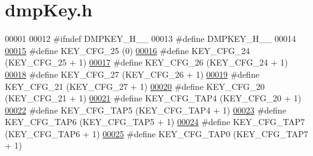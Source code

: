 \hypertarget{dmp_key_8h_source}{}\section{dmp\+Key.\+h}
\label{dmp_key_8h_source}

\begin{DoxyCode}
00001 
00012 \textcolor{preprocessor}{#ifndef DMPKEY\_H\_\_}
00013 \textcolor{preprocessor}{#define DMPKEY\_H\_\_}
00014 
\hypertarget{dmp_key_8h_source.tex_l00015}{}\hyperlink{dmp_key_8h_afb06e105999e6243c0ae2e818034647e}{00015} \textcolor{preprocessor}{#define KEY\_CFG\_25                  (0)}
\hypertarget{dmp_key_8h_source.tex_l00016}{}\hyperlink{dmp_key_8h_aa5e453c6dea0f527e5bd6c30a5ed445d}{00016} \textcolor{preprocessor}{#define KEY\_CFG\_24                  (KEY\_CFG\_25 + 1)}
\hypertarget{dmp_key_8h_source.tex_l00017}{}\hyperlink{dmp_key_8h_a3a8e339ff2e7e0356c7e71426d8675cf}{00017} \textcolor{preprocessor}{#define KEY\_CFG\_26                  (KEY\_CFG\_24 + 1)}
\hypertarget{dmp_key_8h_source.tex_l00018}{}\hyperlink{dmp_key_8h_a4aba163b8ed5e6c1a87c56bf423cc7fd}{00018} \textcolor{preprocessor}{#define KEY\_CFG\_27                  (KEY\_CFG\_26 + 1)}
\hypertarget{dmp_key_8h_source.tex_l00019}{}\hyperlink{dmp_key_8h_acdc7f07883695b91a68b3acc4c31c27f}{00019} \textcolor{preprocessor}{#define KEY\_CFG\_21                  (KEY\_CFG\_27 + 1)}
\hypertarget{dmp_key_8h_source.tex_l00020}{}\hyperlink{dmp_key_8h_abe161054d4821ef13eca134276cbe871}{00020} \textcolor{preprocessor}{#define KEY\_CFG\_20                  (KEY\_CFG\_21 + 1)}
\hypertarget{dmp_key_8h_source.tex_l00021}{}\hyperlink{dmp_key_8h_a3a4710e22864214fe2ab8a080814d085}{00021} \textcolor{preprocessor}{#define KEY\_CFG\_TAP4                (KEY\_CFG\_20 + 1)}
\hypertarget{dmp_key_8h_source.tex_l00022}{}\hyperlink{dmp_key_8h_a91494c73908d422b5e139346abe52e5a}{00022} \textcolor{preprocessor}{#define KEY\_CFG\_TAP5                (KEY\_CFG\_TAP4 + 1)}
\hypertarget{dmp_key_8h_source.tex_l00023}{}\hyperlink{dmp_key_8h_aeeb1342d7237f5dd71a62f3cc5285eee}{00023} \textcolor{preprocessor}{#define KEY\_CFG\_TAP6                (KEY\_CFG\_TAP5 + 1)}
\hypertarget{dmp_key_8h_source.tex_l00024}{}\hyperlink{dmp_key_8h_ac1c8373cbe29cee40b8b645820424862}{00024} \textcolor{preprocessor}{#define KEY\_CFG\_TAP7                (KEY\_CFG\_TAP6 + 1)}
\hypertarget{dmp_key_8h_source.tex_l00025}{}\hyperlink{dmp_key_8h_a2381461c31df922510a2dab0c87074dc}{00025} \textcolor{preprocessor}{#define KEY\_CFG\_TAP0                (KEY\_CFG\_TAP7 + 1)}

\end{DoxyCode}
